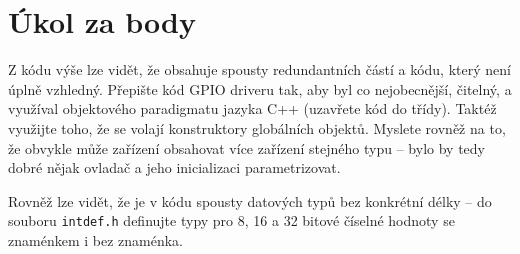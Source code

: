 \documentclass{article}
\begin{document}
\section{Úkol za body}

Z kódu výše lze vidět, že obsahuje spousty redundantních částí a kódu, který není úplně vzhledný. Přepište kód GPIO driveru tak, aby byl co nejobecnější, čitelný, a využíval objektového paradigmatu jazyka C++ (uzavřete kód do třídy). Taktéž využijte toho, že se volají konstruktory globálních objektů. Myslete rovněž na to, že obvykle může zařízení obsahovat více zařízení stejného typu -- bylo by tedy dobré nějak ovladač a jeho inicializaci parametrizovat.

Rovněž lze vidět, že je v kódu spousty datových typů bez konkrétní délky -- do souboru \texttt{intdef.h} definujte typy pro 8, 16 a 32 bitové číselné hodnoty se znaménkem i bez znaménka.
\end{document}
